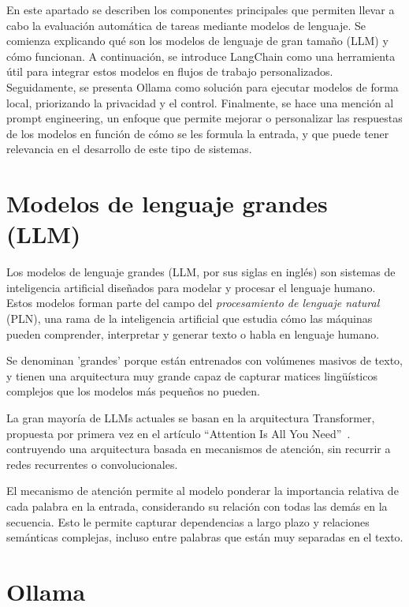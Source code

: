 
En este apartado se describen los componentes principales que permiten llevar 
a cabo la evaluación automática de tareas mediante modelos de lenguaje. 
Se comienza explicando qué son los modelos de lenguaje de gran tamaño (LLM) 
y cómo funcionan. A continuación, se introduce LangChain como una herramienta 
útil para integrar estos modelos en flujos de trabajo personalizados. 
Seguidamente, se presenta Ollama como solución para ejecutar modelos de forma 
local, priorizando la privacidad y el control. Finalmente, se hace una mención 
al prompt engineering, un enfoque que permite mejorar o personalizar las 
respuestas de los modelos en función de cómo se les formula la entrada, y 
que puede tener relevancia en el desarrollo de este tipo de sistemas.

\section{Modelos de lenguaje grandes (LLM)}

Los modelos de lenguaje grandes (LLM, por sus siglas en inglés) son sistemas de 
inteligencia artificial diseñados para modelar y procesar el lenguaje humano. 
Estos modelos forman parte del campo del \textit{procesamiento de lenguaje natural} (PLN), 
una rama de la inteligencia artificial que estudia cómo las máquinas pueden comprender, 
interpretar y generar texto o habla en lenguaje humano.

Se denominan 'grandes' porque están entrenados con volúmenes 
masivos de texto, y tienen una arquitectura muy grande capaz de capturar matices 
lingüísticos complejos que los modelos más pequeños no pueden.

La gran mayoría de LLMs actuales se basan en la arquitectura Transformer, propuesta por 
primera vez en el artículo ``Attention Is All You Need''~\cite{vaswani2017}. 
contruyendo una arquitectura basada en mecanismos de atención, sin recurrir a 
redes recurrentes o convolucionales.

El mecanismo de atención permite al modelo ponderar la importancia relativa de cada palabra 
en la entrada, considerando su relación con todas las demás en la secuencia. Esto le permite 
capturar dependencias a largo plazo y relaciones semánticas complejas, incluso entre palabras 
que están muy separadas en el texto.

\section{Ollama}

